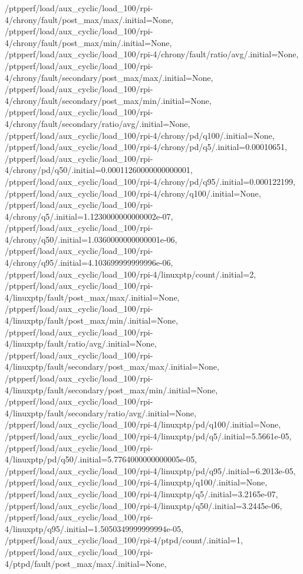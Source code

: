 {    /ptpperf/load/aux_cyclic/load_100/rpi-4/chrony/fault/post_max/max/.initial=None,
    /ptpperf/load/aux_cyclic/load_100/rpi-4/chrony/fault/post_max/min/.initial=None,
    /ptpperf/load/aux_cyclic/load_100/rpi-4/chrony/fault/ratio/avg/.initial=None,
    /ptpperf/load/aux_cyclic/load_100/rpi-4/chrony/fault/secondary/post_max/max/.initial=None,
    /ptpperf/load/aux_cyclic/load_100/rpi-4/chrony/fault/secondary/post_max/min/.initial=None,
    /ptpperf/load/aux_cyclic/load_100/rpi-4/chrony/fault/secondary/ratio/avg/.initial=None,
    /ptpperf/load/aux_cyclic/load_100/rpi-4/chrony/pd/q100/.initial=None,
    /ptpperf/load/aux_cyclic/load_100/rpi-4/chrony/pd/q5/.initial=0.00010651,
    /ptpperf/load/aux_cyclic/load_100/rpi-4/chrony/pd/q50/.initial=0.00011260000000000001,
    /ptpperf/load/aux_cyclic/load_100/rpi-4/chrony/pd/q95/.initial=0.000122199,
    /ptpperf/load/aux_cyclic/load_100/rpi-4/chrony/q100/.initial=None,
    /ptpperf/load/aux_cyclic/load_100/rpi-4/chrony/q5/.initial=1.1230000000000002e-07,
    /ptpperf/load/aux_cyclic/load_100/rpi-4/chrony/q50/.initial=1.0360000000000001e-06,
    /ptpperf/load/aux_cyclic/load_100/rpi-4/chrony/q95/.initial=4.103699999999996e-06,
    /ptpperf/load/aux_cyclic/load_100/rpi-4/linuxptp/count/.initial=2,
    /ptpperf/load/aux_cyclic/load_100/rpi-4/linuxptp/fault/post_max/max/.initial=None,
    /ptpperf/load/aux_cyclic/load_100/rpi-4/linuxptp/fault/post_max/min/.initial=None,
    /ptpperf/load/aux_cyclic/load_100/rpi-4/linuxptp/fault/ratio/avg/.initial=None,
    /ptpperf/load/aux_cyclic/load_100/rpi-4/linuxptp/fault/secondary/post_max/max/.initial=None,
    /ptpperf/load/aux_cyclic/load_100/rpi-4/linuxptp/fault/secondary/post_max/min/.initial=None,
    /ptpperf/load/aux_cyclic/load_100/rpi-4/linuxptp/fault/secondary/ratio/avg/.initial=None,
    /ptpperf/load/aux_cyclic/load_100/rpi-4/linuxptp/pd/q100/.initial=None,
    /ptpperf/load/aux_cyclic/load_100/rpi-4/linuxptp/pd/q5/.initial=5.5661e-05,
    /ptpperf/load/aux_cyclic/load_100/rpi-4/linuxptp/pd/q50/.initial=5.7764000000000005e-05,
    /ptpperf/load/aux_cyclic/load_100/rpi-4/linuxptp/pd/q95/.initial=6.2013e-05,
    /ptpperf/load/aux_cyclic/load_100/rpi-4/linuxptp/q100/.initial=None,
    /ptpperf/load/aux_cyclic/load_100/rpi-4/linuxptp/q5/.initial=3.2165e-07,
    /ptpperf/load/aux_cyclic/load_100/rpi-4/linuxptp/q50/.initial=3.2445e-06,
    /ptpperf/load/aux_cyclic/load_100/rpi-4/linuxptp/q95/.initial=1.5050349999999994e-05,
    /ptpperf/load/aux_cyclic/load_100/rpi-4/ptpd/count/.initial=1,
    /ptpperf/load/aux_cyclic/load_100/rpi-4/ptpd/fault/post_max/max/.initial=None,
}
